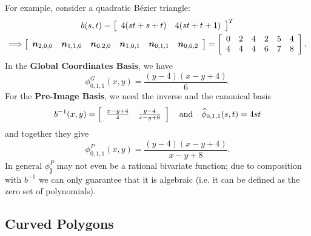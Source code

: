 \noindent For example, consider a quadratic B\'{e}zier triangle:
\begin{gather}
b(s, t) = \left[ \begin{array}{c c}
    4 (s t + s + t) & 4 (s t + t + 1)
  \end{array}\right]^T \\
\Longrightarrow
\left[ \begin{array}{c c c c c c}
    \bm{n}_{2, 0, 0} &
    \bm{n}_{1, 1, 0} &
    \bm{n}_{0, 2, 0} &
    \bm{n}_{1, 0, 1} &
    \bm{n}_{0, 1, 1} &
    \bm{n}_{0, 0, 2}
  \end{array}\right] = \left[ \begin{array}{c c c c c c}
    0 & 2 & 4 & 2 & 5 & 4 \\
    4 & 4 & 4 & 6 & 7 & 8
  \end{array}\right].
\end{gather}
In the \textbf{Global Coordinates Basis}, we have
\begin{equation}
\phi^{G}_{0, 1, 1}(x, y) = \frac{(y - 4) (x - y + 4)}{6}.
\end{equation}
For the \textbf{Pre-Image Basis}, we need the inverse
and the canonical basis
\begin{equation}
b^{-1}(x, y) = \left[ \begin{array}{c c}
    \frac{x - y + 4}{4} & \frac{y - 4}{x - y + 8}
  \end{array}\right] \quad \text{and} \quad
\widehat{\phi}_{0, 1, 1}(s, t) = 4 s t
\end{equation}
and together they give
\begin{equation}
\phi^{P}_{0, 1, 1}(x, y) = \frac{(y - 4) (x - y + 4)}{x - y + 8}.
\end{equation}
In general \(\phi_{\bm{j}}^P\) may not even be a rational bivariate
function; due to composition with \(b^{-1}\) we can only guarantee that
it is algebraic (i.e. it can be defined as the zero set of polynomials).

\subsection{Curved Polygons}\label{subsec:curved-polygons}

